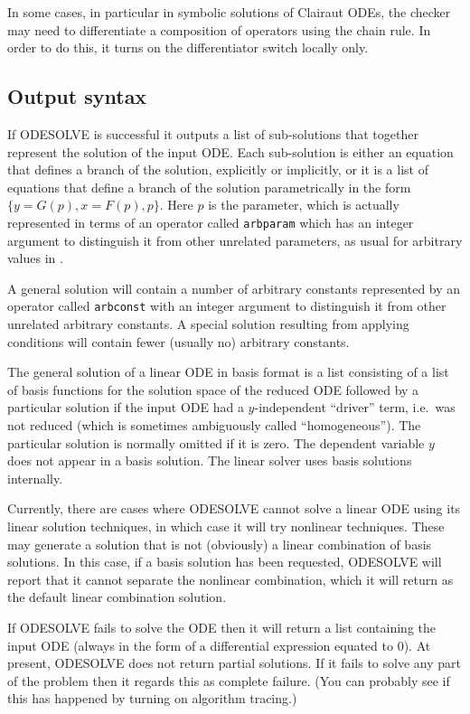 In some cases, in particular in symbolic solutions of Clairaut ODEs,
the checker may need to differentiate a composition of operators using
the chain rule.  In order to do this, it turns on the differentiator
switch  locally only.


\subsection{Output syntax}

If ODESOLVE is successful it outputs a list of sub-solutions that
together represent the solution of the input ODE\@.  Each sub-solution
is either an equation that defines a branch of the solution,
explicitly or implicitly, or it is a list of equations that define a
branch of the solution parametrically in the form $\{y = G(p), x =
F(p), p\}$.  Here $p$ is the parameter, which is actually represented
in terms of an operator called \texttt{arbparam} which has an integer
argument to distinguish it from other unrelated parameters, as usual
for arbitrary values in \REDUCE{}.

A general solution will contain a number of arbitrary constants
represented by an operator called \texttt{arbconst} with an integer
argument to distinguish it from other unrelated arbitrary constants.
A special solution resulting from applying conditions will contain
fewer (usually no) arbitrary constants.

The general solution of a linear ODE in basis format is a list
consisting of a list of basis functions for the solution space of the
reduced ODE followed by a particular solution if the input ODE had a
$y$-independent ``driver'' term, i.e.\ was not reduced (which is
sometimes ambiguously called ``homogeneous'').  The particular
solution is normally omitted if it is zero.  The dependent variable
$y$ does not appear in a basis solution.  The linear solver uses basis
solutions internally.

Currently, there are cases where ODESOLVE cannot solve a linear ODE
using its linear solution techniques, in which case it will try
nonlinear techniques.  These may generate a solution that is not
(obviously) a linear combination of basis solutions.  In this case, if
a basis solution has been requested, ODESOLVE will report that it
cannot separate the nonlinear combination, which it will return as the
default linear combination solution.

If ODESOLVE fails to solve the ODE then it will return a list
containing the input ODE (always in the form of a differential
expression equated to 0).  At present, ODESOLVE does not return
partial solutions.  If it fails to solve any part of the problem then
it regards this as complete failure.  (You can probably see if this
has happened by turning on algorithm tracing.)


